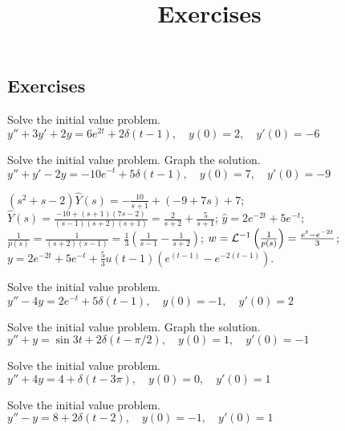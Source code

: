 \documentclass{ximera}
\title{Exercises} \license{CC BY-NC-SA 4.0}
\begin{document}
\begin{abstract}
\end{abstract}
\maketitle

\begin{onlineOnly}
\section*{Exercises}
\end{onlineOnly}

\begin{problem}\label{exer:8.7.1}
Solve the initial value
problem.
 $y''+3y'+2y=6e^{2t}+2\delta(t-1), \quad  y(0)=2,\quad y'(0)=-6$
\end{problem}

\begin{problem}\label{exer:8.7.2} 
Solve the initial value
problem.  Graph the solution.
 $y''+y'-2y=-10e^{-t}+5\delta(t-1), \quad  y(0)=7,\quad y'(0)=-9$

\begin{solution}
$(s^2+s-2)\hat Y(s)=-\frac{10}{s+1}+(-9+7s)+7$;
$\hat Y(s)=\frac{-10+(s+1)(7s-2)}{(s-1)(s+2)(s+1)}=\frac{2}{s+2}+\frac{5}{s+1}$;
$\hat y=2e^{-2t}+5e^{-t}$;
$\frac{1}{p(s)}=\frac{1}{(s+2)(s-1)}=\frac{1}{3}\left(\frac{1}{s-1}-\frac{1}{s+2}\right)$;
$w={\cal L}^{-1}\left(\frac{1}{p(s)}\right)=\frac{e^t-e^{-2t}}{3}$;
$y=2e^{-2t}+5e^{-t}+\frac{5}{3}u(t-1)\left(e^{(t-1)}-e^{-2(t-1)}\right)$.
\end{solution}
\end{problem}

\begin{problem}\label{exer:8.7.3}
Solve the initial value
problem.
 $y''-4y=2e^{-t}+5\delta(t-1), \quad  y(0)=-1,\quad y'(0)=2$
\end{problem}

\begin{problem}\label{exer:8.7.4}  Solve the initial value problem.  Graph the solution.
 $y''+y=\sin3t+2\delta(t-\pi/2), \quad  y(0)=1,\quad y'(0)=-1$
\end{problem}

\begin{problem}\label{exer:8.7.5} 
Solve the initial value
problem.
 $y''+4y=4+\delta(t-3\pi), \quad  y(0)=0,\quad y'(0)=1$
\end{problem}

\begin{problem}\label{exer:8.7.6}
Solve the initial value
problem.
 $y''-y=8+2\delta(t-2), \quad  y(0)=-1,\quad y'(0)=1$
\end{problem}
\end{document}
